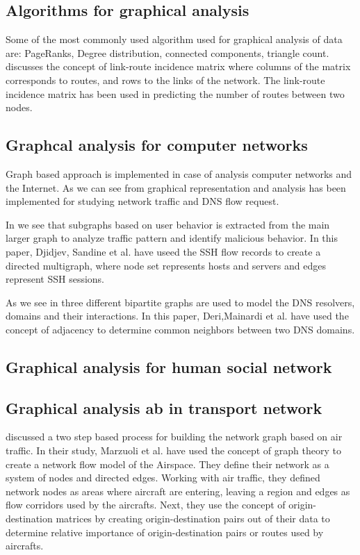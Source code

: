 \subsection{Algorithms for graphical analysis} 
Some of the most commonly used algorithm used for graphical analysis of data are: PageRanks, Degree distribution, connected components, triangle count.
\cite{kelly2008mathematics} discusses the concept of link-route incidence matrix where columns of the matrix corresponds to routes, and rows to the links of the network. The link-route incidence matrix has been used in predicting the number of routes between two nodes.
\subsection{Graphcal analysis for computer networks}
Graph based approach is implemented in case of analysis computer networks and the Internet. As we can see from \cite{djidjev2011graph} \cite{deri2013graph} graphical representation and analysis has been implemented for studying network traffic and DNS flow request. 

In \cite{djidjev2011graph} we see that subgraphs based on user behavior is extracted from the main larger graph to analyze traffic pattern and identify malicious behavior. In this paper, Djidjev, Sandine et al. have useed the SSH flow records to create a directed multigraph, where node set represents hosts and servers and edges represent SSH sessions. 

As we see in \cite{deri2013graph} three different bipartite graphs are used to model the DNS resolvers, domains and their interactions. In this paper, Deri,Mainardi et al. have used the concept of adjacency to determine common neighbors between two DNS domains. 
\subsection{Graphical analysis for human social network}
\subsection{Graphical analysis ab in transport network}
\cite{marzuoli2011two} discussed a two step based process for building the network graph based on air traffic. In their study, Marzuoli et al. have used the concept of graph theory to create a network flow model of the Airspace. They define their network as a system of nodes and directed edges. Working with air traffic, they defined network nodes as areas where aircraft are entering, leaving a region and edges as flow corridors used by the aircrafts. Next, they use the concept of origin-destination matrices by creating origin-destination pairs out of their data to determine relative importance of origin-destination pairs or routes used by aircrafts.
